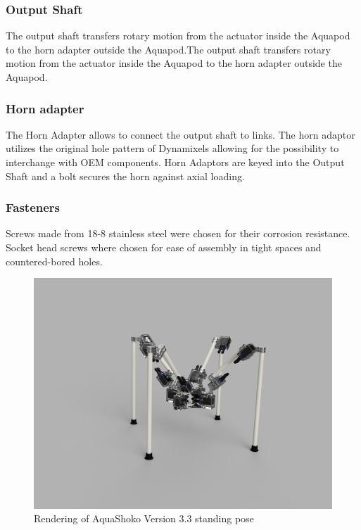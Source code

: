 \subsubsection{Output Shaft}
The output shaft transfers rotary motion from the actuator inside the Aquapod to the horn adapter outside the Aquapod.The output shaft transfers rotary motion from the actuator inside the Aquapod to the horn adapter outside the Aquapod.

\subsubsection{Horn adapter}
The Horn Adapter allows to connect the output shaft to links. The horn adaptor utilizes the original hole pattern of Dynamixels allowing for the possibility to interchange with OEM components.
Horn Adaptors are keyed into the Output Shaft and a bolt secures the horn against axial loading. 

\subsubsection{Fasteners}
Screws made from 18-8 stainless steel were chosen for their corrosion resistance. Socket head screws where chosen for ease of assembly in tight spaces and countered-bored holes.

\begin{figure}[h]
\centering
\includegraphics[width=1.0\columnwidth]{./img/aquaShoko-v3dot3-render-standPose.png}
\caption{Rendering of AquaShoko Version 3.3 standing pose}
\label{fig:shoko stand pose}
\end{figure}



